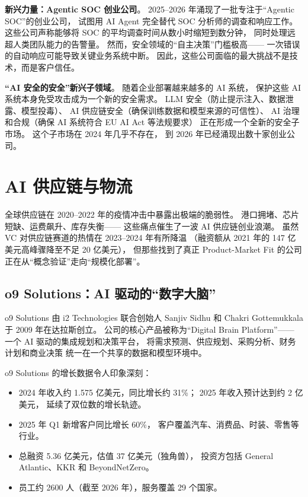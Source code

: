 \textbf{新兴力量：Agentic SOC 创业公司}。
2025--2026 年涌现了一批专注于``Agentic SOC''的创业公司，
试图用 AI Agent 完全替代 SOC 分析师的调查和响应工作。
这些公司声称能够将 SOC 的平均调查时间从数小时缩短到数分钟，
同时处理远超人类团队能力的告警量。
然而，安全领域的``自主决策''门槛极高——
一次错误的自动响应可能导致关键业务系统中断。
因此，这些公司面临的最大挑战不是技术，而是客户信任。

\textbf{``AI 安全的安全''新兴子领域}。
随着企业部署越来越多的 AI 系统，
保护这些 AI 系统本身免受攻击成为一个新的安全需求。
LLM 安全（防止提示注入、数据泄露、模型投毒）、
AI 供应链安全（确保训练数据和模型来源的可信性）、
AI 治理和合规（确保 AI 系统符合 EU AI Act 等法规要求）
正在形成一个全新的安全子市场。
这个子市场在 2024 年几乎不存在，
到 2026 年已经涌现出数十家创业公司。


\section{AI 供应链与物流}
\label{sec:ent-supply-chain}

全球供应链在 2020--2022 年的疫情冲击中暴露出极端的脆弱性。
港口拥堵、芯片短缺、运费飙升、库存失衡——
这些痛点催生了一波 AI 供应链创业浪潮。
虽然 VC 对供应链赛道的热情在 2023--2024 年有所降温
（融资额从 2021 年的 147 亿美元高峰骤降至不足 20 亿美元），
但那些找到了真正 Product-Market Fit 的公司
正在从``概念验证''走向``规模化部署''。

\subsection{o9 Solutions：AI 驱动的``数字大脑''}

o9 Solutions 由 i2 Technologies 联合创始人 Sanjiv Sidhu 和 Chakri Gottemukkala
于 2009 年在达拉斯创立。
公司的核心产品被称为``Digital Brain Platform''——
一个 AI 驱动的集成规划和决策平台，
将需求预测、供应规划、采购分析、财务计划和商业决策
统一在一个共享的数据和模型环境中。

o9 Solutions 的增长数据令人印象深刻：

\begin{itemize}[noitemsep]
  \item 2024 年收入约 1.575 亿美元，同比增长约 31\%；
        2025 年收入预计达到约 2 亿美元，
        延续了双位数的增长轨迹。
  \item 2025 年 Q1 新增客户同比增长 60\%，
        客户覆盖汽车、消费品、时装、零售等行业。
  \item 总融资 5.36 亿美元，估值 37 亿美元（独角兽），
        投资方包括 General Atlantic、KKR 和 BeyondNetZero。
  \item 员工约 2600 人（截至 2026 年），服务覆盖 29 个国家。
\end{itemize}

